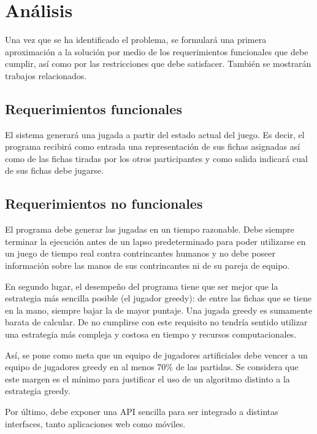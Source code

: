 \chapter{Análisis}

\noindent
Una vez que se ha identificado el problema, se formulará una primera
aproximación a la solución por medio de los requerimientos funcionales que debe
cumplir, así como por las restricciones que debe satisfacer. También se
mostrarán trabajos relacionados.

\newpage

\section{Requerimientos funcionales}

El sistema generará una jugada a partir del estado actual del juego. Es decir,
el programa recibirá como entrada una representación de sus fichas asignadas así
como de las fichas tiradas por los otros participantes y como salida indicará
cual de sus fichas debe jugarse.

\section{Requerimientos no funcionales}

El programa debe generar las jugadas en un tiempo razonable. Debe siempre
terminar la ejecución antes de un lapso predeterminado para poder utilizarse en
un juego de tiempo real contra contrincantes humanos y no debe poseer
información sobre las manos de sus contrincantes ni de su pareja de equipo.

En segundo lugar, el desempeño del programa tiene que ser mejor que la
estrategia más sencilla posible (el jugador greedy): de entre las fichas que se
tiene en la mano, siempre bajar la de mayor puntaje. Una jugada greedy es
sumamente barata de calcular. De no cumplirse con este requisito no tendría
sentido utilizar una estrategia más compleja y costosa en tiempo y recursos
computacionales.

Así, se pone como meta que un equipo de jugadores artificiales debe vencer a un
equipo de jugadores greedy en al menos 70\% de las partidas. Se considera que
este margen es el mínimo para justificar el uso de un algoritmo distinto a la
estrategia greedy.

Por último, debe exponer una API sencilla para ser integrado a distintas
interfaces, tanto aplicaciones web como móviles.


